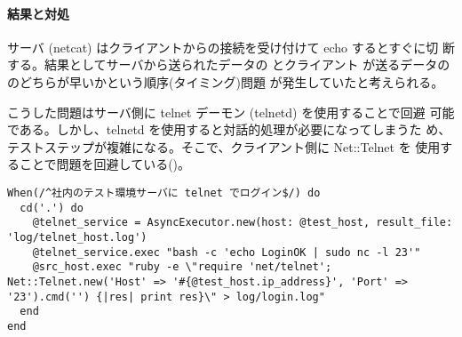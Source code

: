     \paragraph{結果と対処}
サーバ (netcat) はクライアントからの接続を受け付けて echo するとすぐに切
断する。結果としてサーバから送られたデータの  とクライアント
が送るデータの  のどちらが早いかという順序(タイミング)問題
が発生していたと考えられる。

こうした問題はサーバ側に telnet デーモン (telnetd) を使用することで回避
可能である。しかし、telnetd を使用すると対話的処理が必要になってしまうた
め、テストステップが複雑になる。そこで、クライアント側に Net::Telnet を
使用することで問題を回避している()。

\begin{lstlisting}[caption=修正後テストステップ,label=lst:telnet-step-new,linebackgroundcolor={\ifnum\value{lstnumber}=5 \color{green!30}\fi}]
When(/^社内のテスト環境サーバに telnet でログイン$/) do
  cd('.') do
    @telnet_service = AsyncExecutor.new(host: @test_host, result_file: 'log/telnet_host.log')
    @telnet_service.exec "bash -c 'echo LoginOK | sudo nc -l 23'"
    @src_host.exec "ruby -e \"require 'net/telnet'; Net::Telnet.new('Host' => '#{@test_host.ip_address}', 'Port' => '23').cmd('') {|res| print res}\" > log/login.log"
  end
end
\end{lstlisting}

